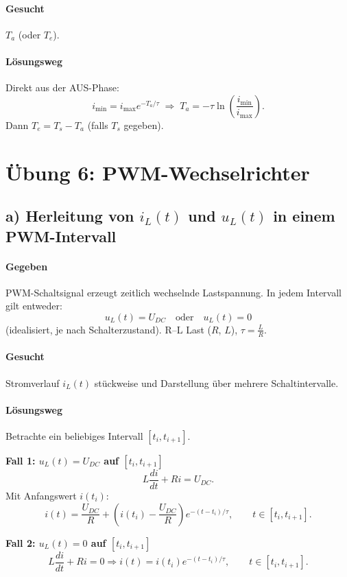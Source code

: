 \paragraph{Gesucht}
$T_a$ (oder $T_e$).

\paragraph{Lösungsweg}
Direkt aus der AUS-Phase:
\[
i_{\min}=i_{\max}e^{-T_a/\tau}
\;\Rightarrow\;
\boxed{T_a=-\tau\ln\!\left(\frac{i_{\min}}{i_{\max}}\right)}.
\]
Dann $T_e=T_s-T_a$ (falls $T_s$ gegeben).


\section{Übung 6: PWM-Wechselrichter }

\subsection*{a) Herleitung von $i_L(t)$ und $u_L(t)$ in einem PWM-Intervall}

\paragraph{Gegeben}
PWM-Schaltsignal erzeugt zeitlich wechselnde Lastspannung.
In jedem Intervall gilt entweder:
\[
u_L(t)=U_{DC}\quad \text{oder}\quad u_L(t)=0
\]
(idealisiert, je nach Schalterzustand).
R--L Last ($R$, $L$), $\tau=\frac{L}{R}$.

\paragraph{Gesucht}
Stromverlauf $i_L(t)$ stückweise und Darstellung über mehrere Schaltintervalle.

\paragraph{Lösungsweg}
Betrachte ein beliebiges Intervall $[t_i,t_{i+1}]$.

\textbf{Fall 1: $u_L(t)=U_{DC}$ auf $[t_i,t_{i+1}]$}
\[
L\frac{di}{dt}+Ri=U_{DC}.
\]
Mit Anfangswert $i(t_i)$:
\[
\boxed{
i(t)=\frac{U_{DC}}{R}+\left(i(t_i)-\frac{U_{DC}}{R}\right)e^{-(t-t_i)/\tau}
},\qquad t\in[t_i,t_{i+1}].
\]

\textbf{Fall 2: $u_L(t)=0$ auf $[t_i,t_{i+1}]$}
\[
L\frac{di}{dt}+Ri=0
\Rightarrow
\boxed{
i(t)=i(t_i)e^{-(t-t_i)/\tau}
},\qquad t\in[t_i,t_{i+1}].
\]

